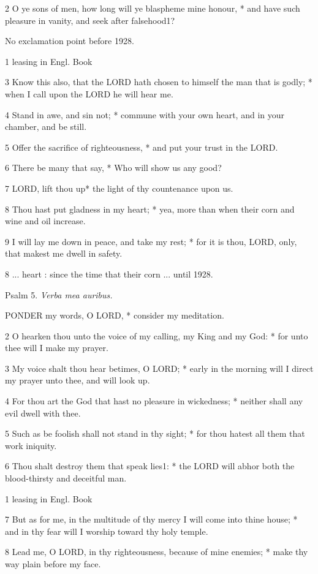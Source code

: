 2 O ye sons of men, how long will ye blaspheme mine
honour, * and have such pleasure in vanity, and seek after falsehood1?

No
exclamation point before 1928.

1 leasing
in Engl. Book

3 Know this also, that the LORD
hath chosen to himself the man that is godly; * when I call upon the LORD
he will hear me.

4 Stand in awe, and sin not; * commune with your own
heart, and in your chamber, and be still.

5 Offer the sacrifice of righteousness, * and put your
trust in the LORD.

6 There be many that say, * Who will show us any good?

7 LORD, lift thou up* the light
of thy countenance upon us.

8 Thou hast put gladness in my heart; * yea, more than
when their corn and wine and oil increase.

9 I will lay me down in peace, and take my rest; *
for it is thou, LORD, only, that makest me dwell
in safety.

8 ... heart : since the time that
their corn ... until
1928.

Psalm
5. \emph{Verba mea auribus.}

PONDER
my words, O LORD, * consider my meditation.

2 O hearken thou unto the voice of my calling, my King
and my God: * for unto thee will I make my prayer.

3 My voice shalt thou hear betimes, O LORD;
* early in the morning will I direct my prayer unto thee, and will look
up.

4 For thou art the God that hast no pleasure in wickedness;
* neither shall any evil dwell with thee.

5 Such as be foolish shall not stand in thy sight;
* for thou hatest all them that work iniquity.

6 Thou shalt destroy them that speak lies1:
* the LORD will abhor both the blood-thirsty and
deceitful man. 

1 leasing
in Engl. Book

7 But as for me, in the multitude of thy mercy I will come into thine
house; * and in thy fear will I worship toward thy holy temple.

8 Lead me, O LORD, in thy righteousness,
because of mine enemies; * make thy way plain before my face.

